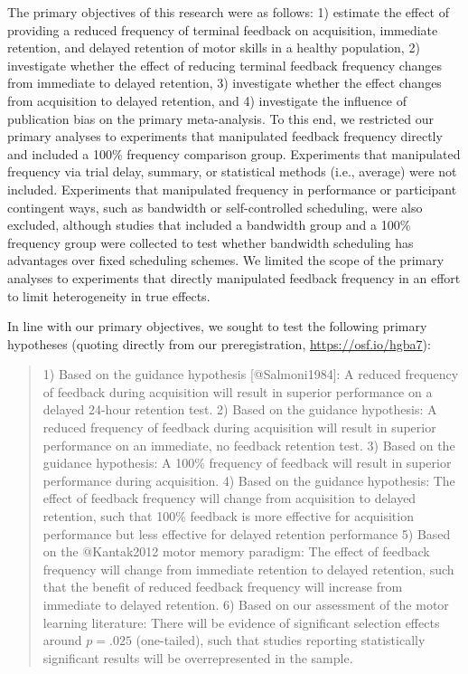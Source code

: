 \documentclass[
  english,
  man,mask,floatsintext]{apa7}
\begin{document}
The primary objectives of this research were as follows: 1) estimate the effect of providing a reduced frequency of terminal feedback on acquisition, immediate retention, and delayed retention of motor skills in a healthy population, 2) investigate whether the effect of reducing terminal feedback frequency changes from immediate to delayed retention, 3) investigate whether the effect changes from acquisition to delayed retention, and 4) investigate the influence of publication bias on the primary meta-analysis. To this end, we restricted our primary analyses to experiments that manipulated feedback frequency directly and included a 100\% frequency comparison group. Experiments that manipulated frequency via trial delay, summary, or statistical methods (i.e., average) were not included. Experiments that manipulated frequency in performance or participant contingent ways, such as bandwidth or self-controlled scheduling, were also excluded, although studies that included a bandwidth group and a 100\% frequency group were collected to test whether bandwidth scheduling has advantages over fixed scheduling schemes. We limited the scope of the primary analyses to experiments that directly manipulated feedback frequency in an effort to limit heterogeneity in true effects.

In line with our primary objectives, we sought to test the following primary hypotheses (quoting directly from our preregistration, \url{https://osf.io/hgba7}):

\blockquote{1)   Based on the guidance hypothesis [@Salmoni1984]: A reduced frequency of feedback during acquisition will result in superior performance on a delayed 24-hour retention test. 
2)  Based on the guidance hypothesis: A reduced frequency of feedback during acquisition will result in superior performance on an immediate, no feedback retention test. 
3)  Based on the guidance hypothesis: A 100\% frequency of feedback will result in superior performance during acquisition.
4)  Based on the guidance hypothesis: The effect of feedback frequency will change from acquisition to delayed retention, such that 100\% feedback is more effective for acquisition performance but less effective for delayed retention performance
5)  Based on the @Kantak2012 motor memory paradigm: The effect of feedback frequency will change from immediate retention to delayed retention, such that the benefit of reduced feedback frequency will increase from immediate to delayed retention. 
6)  Based on our assessment of the motor learning literature: There will be evidence of significant selection effects around $p = .025$ (one-tailed), such that studies reporting statistically significant results will be overrepresented in the sample.}
\end{document}
